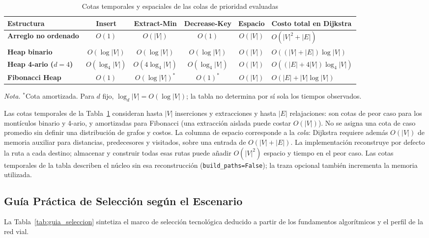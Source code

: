 \begin{table}[H]
    \centering
    \fontsize{9}{11}\selectfont
    \renewcommand{\arraystretch}{1.18}
    \setlength{\tabcolsep}{3.5pt}
    \caption{Cotas temporales y espaciales de las colas de prioridad evaluadas}
    \label{tab:complejidades}
    \begin{tabularx}{\textwidth}{@{}>{\bfseries}l cccc >{\raggedright\arraybackslash}X@{}}
        \toprule
        \textbf{Estructura} & \textbf{Insert} & \textbf{Extract-Min} & \textbf{Decrease-Key} & \textbf{Espacio} & \textbf{Costo total en Dijkstra} \\
        \midrule
        Arreglo no ordenado & $O(1)$ & $O(|V|)$ & $O(1)$ & $O(|V|)$ & $O(|V|^2 + |E|)$ \\
        Heap binario & $O(\log |V|)$ & $O(\log |V|)$ & $O(\log |V|)$ & $O(|V|)$ & $O((|V|+|E|)\log |V|)$ \\
        Heap 4-ario ($d=4$) & $O(\log_4 |V|)$ & $O(4\log_4 |V|)$ & $O(\log_4 |V|)$ & $O(|V|)$ & $O((|E|+4|V|)\log_4 |V|)$ \\
        Fibonacci Heap & $O(1)$ & $O(\log |V|)^*$ & $O(1)^*$ & $O(|V|)$ & $O(|E| + |V|\log |V|)$ \\
        \bottomrule
    \end{tabularx}
    \par\vspace{0.1cm}
    \raggedright\fontsize{8.5}{10.5}\selectfont\textit{Nota.} $^*$Cota amortizada. Para $d$ fijo, $\log_d |V| = O(\log |V|)$; la tabla no determina por sí sola los tiempos observados.
\end{table}

Las cotas temporales de la Tabla~\ref{tab:complejidades} consideran hasta $|V|$ inserciones y extracciones y hasta $|E|$ relajaciones: son cotas de peor caso para los montículos binario y 4-ario, y amortizadas para Fibonacci (una extracción aislada puede costar $O(|V|)$). No se asigna una cota de caso promedio sin definir una distribución de grafos y costos. La columna de espacio corresponde a la \emph{cola}: Dijkstra requiere además $O(|V|)$ de memoria auxiliar para distancias, predecesores y visitados, sobre una entrada de $O(|V|+|E|)$. La implementación reconstruye por defecto la ruta a cada destino; almacenar y construir todas esas rutas puede añadir $O(|V|^2)$ espacio y tiempo en el peor caso. Las cotas temporales de la tabla describen el núcleo sin esa reconstrucción (\texttt{build\_paths=False}); la traza opcional también incrementa la memoria utilizada.

\subsection{Guía Práctica de Selección según el Escenario}
La Tabla~\ref{tab:guia_seleccion} sintetiza el marco de selección tecnológica deducido a partir de los fundamentos algorítmicos y el perfil de la red vial.

